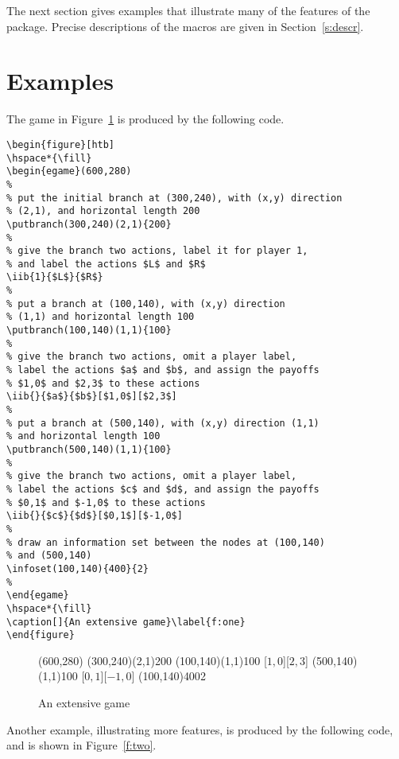 \documentclass[12pt]{article}
\begin{document}
The next section gives examples that illustrate many of the features of the
package.  Precise descriptions of the macros are given in
Section~\ref{s:descr}.
\section{Examples}
The game in Figure~\ref{f:one} is produced by the following code.

\begin{verbatim}
\begin{figure}[htb]
\hspace*{\fill}
\begin{egame}(600,280)
%
% put the initial branch at (300,240), with (x,y) direction
% (2,1), and horizontal length 200
\putbranch(300,240)(2,1){200}
%
% give the branch two actions, label it for player 1,
% and label the actions $L$ and $R$
\iib{1}{$L$}{$R$}
%
% put a branch at (100,140), with (x,y) direction
% (1,1) and horizontal length 100
\putbranch(100,140)(1,1){100}
%
% give the branch two actions, omit a player label,
% label the actions $a$ and $b$, and assign the payoffs
% $1,0$ and $2,3$ to these actions
\iib{}{$a$}{$b$}[$1,0$][$2,3$]
%
% put a branch at (500,140), with (x,y) direction (1,1)
% and horizontal length 100
\putbranch(500,140)(1,1){100}
%
% give the branch two actions, omit a player label, 
% label the actions $c$ and $d$, and assign the payoffs
% $0,1$ and $-1,0$ to these actions
\iib{}{$c$}{$d$}[$0,1$][$-1,0$]
%
% draw an information set between the nodes at (100,140)
% and (500,140)
\infoset(100,140){400}{2}
%
\end{egame}
\hspace*{\fill}
\caption[]{An extensive game}\label{f:one}
\end{figure}
\end{verbatim}

\begin{figure}[htb]
\hspace*{\fill}
\begin{egame}(600,280)
\putbranch(300,240)(2,1){200}
\putbranch(100,140)(1,1){100}
[$1,0$][$2,3$]
\putbranch(500,140)(1,1){100}
[$0,1$][$-1,0$]
\infoset(100,140){400}{2}
\end{egame}
\hspace*{\fill}
\caption[]{An extensive game}\label{f:one}
\end{figure}

Another example, illustrating more features, is produced by the following
code, and is shown in Figure~\ref{f:two}.
\end{document}
